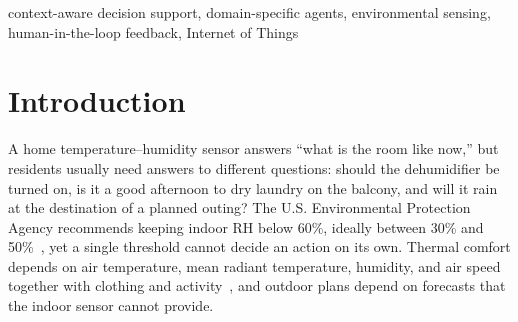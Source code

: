 \documentclass[conference]{IEEEtran}
\begin{document}
\begin{abstract}
Indoor environmental management requires more than displaying temperature and relative humidity (RH); residents must decide when to dehumidify, ventilate, go out, or dry laundry, and these decisions depend on outdoor conditions at a different place and time. Indoor sensor readings and outdoor weather forecasts differ in spatial coverage, temporal validity, and data semantics, and different appliance operations can produce similar indoor trajectories. This paper proposes an evidence-traceable, domain-specific agent that integrates single-room sensing, township-level forecasts, versioned domain rules, and user feedback through constrained tool routing and rule-guided reasoning. An ESP32 node publishes measurements over MQTT to an SQLite store; a Python analytics engine performs quality checks, trend analysis, and event detection; and a large language model (LLM) is restricted to intent parsing, tool selection, and explanation, with every recommendation bound to an evidence record of values, sources, validity windows, and rule versions. An event-triggered feedback loop with event aggregation and a query cooldown collects time-aligned operation labels while bounding user interruptions, and keeps unanswered queries as unknown rather than negative. We define a two-week single-room protocol with event-grouped temporal splits that compares a fixed-rule baseline with a decision tree, two feedback policies, and template versus agent responses in terms of macro-F1, interaction burden, evidence consistency, and latency.
\end{abstract}

\begin{IEEEkeywords}
context-aware decision support, domain-specific agents, environmental sensing, human-in-the-loop feedback, Internet of Things
\end{IEEEkeywords}

\section{Introduction}
A home temperature--humidity sensor answers ``what is the room like now,'' but residents usually need answers to different questions: should the dehumidifier be turned on, is it a good afternoon to dry laundry on the balcony, and will it rain at the destination of a planned outing? The U.S. Environmental Protection Agency recommends keeping indoor RH below 60\%, ideally between 30\% and 50\%~\cite{epa_mold}, yet a single threshold cannot decide an action on its own. Thermal comfort depends on air temperature, mean radiant temperature, humidity, and air speed together with clothing and activity~\cite{ashrae55,mishra2026myths}, and outdoor plans depend on forecasts that the indoor sensor cannot provide.
\end{document}
